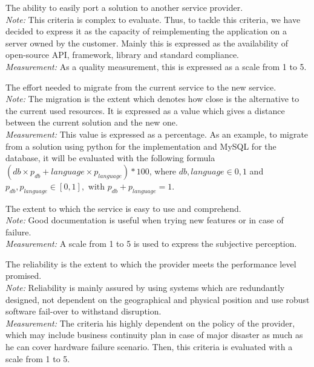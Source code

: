 \documentclass[a4paper,11pt]{article}
\begin{document}
\begin{description}[parsep=1pt,listparindent=\parindent,labelindent=\parindent,font=$\bullet$\ ]
  \item[Portability:] The ability to easily port a solution to another service provider.\\
    \emph{Note:} This criteria is complex to evaluate. Thus, to tackle this criteria, we have decided to express it as the capacity of reimplementing the application on a server owned by the customer. Mainly this is expressed as the availability of open-source API, framework, library and standard compliance.\\
    \emph{Measurement:} As a quality measurement, this is expressed as a scale from 1 to 5.

  \item[Migration:] The effort needed to migrate from the current service to the new service.\\
    \emph{Note:} The migration is the extent which denotes how close is the alternative to the current used resources. It is expressed as a value which gives a distance between the current solution and the new one.\\
    \emph{Measurement:} This value is expressed as a percentage. As an example, to migrate from a solution using python for the implementation and MySQL for the database, it will be evaluated with the following formula $( db \times p_{db} + language \times p_{language})  * 100 $, where $ db, language \in {0,1} $ and $ p_{db}, p_{language} \in [ 0, 1 ], \text{ with } p_{db} + p_{language} = 1$. 

  \item[Usability:] The extent to which the service is easy to use and comprehend.\\
    \emph{Note:} Good documentation is useful when trying new features or in case of failure.\\
    \emph{Measurement:} A scale from 1 to 5 is used to express the subjective perception.

  \item[Reliability:] The reliability is the extent to which the provider meets the performance level promised.\\
    \emph{Note:} Reliability is mainly assured by using systems which are redundantly designed, not dependent on the geographical and physical position and use robust software fail-over to withstand disruption.\\
    \emph{Measurement:} The criteria his highly dependent on the policy of the provider, which may include business continuity plan in case of major disaster as much as he can cover hardware failure scenario. Then, this criteria is evaluated with a scale from 1 to 5.


\end{description}
\end{document}
